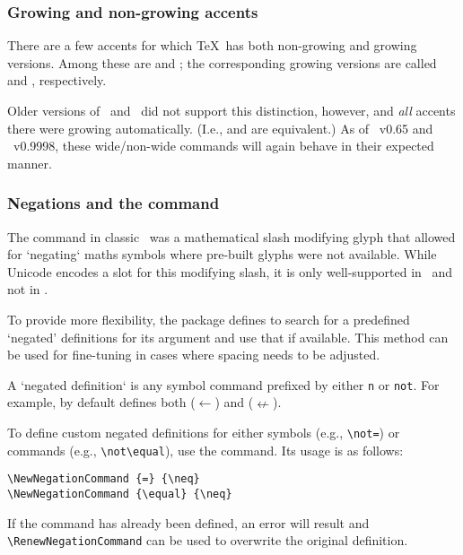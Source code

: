 \subsubsection{Growing and non-growing accents}

There are a few accents for which \TeX\ has both non-growing and growing
versions.  Among these are  and ; the corresponding growing
versions are called  and , respectively.

Older versions of \XeTeX\ and \LuaTeX\ did not support this distinction,
however, and \emph{all} accents there were growing automatically. (I.e.,
 and  are equivalent.) As of \LuaTeX\ v0.65 and \XeTeX\
v0.9998, these wide/non-wide commands will again behave in their expected
manner.


\subsubsection{Negations and the  command}

The  command in classic \LaTeXe\ was a mathematical slash modifying glyph that allowed for `negating` maths symbols where pre-built glyphs were not available. While Unicode encodes a slot for this modifying slash, it is only well-supported in \LuaTeX\ and not in \XeTeX.

To provide more flexibility, the  package defines  to search for a predefined `negated' definitions for its argument and use that if available. This method can be used for fine-tuning in cases where spacing needs to be adjusted.

A `negated definition` is any symbol command prefixed by either \verb|n| or \verb|not|. For example,  by default defines both  ($\leftarrow$) and  ($\nleftarrow$).

To define custom negated definitions for either symbols (e.g., \verb|\not=|) or commands (e.g., \verb|\not\equal|), use the  command. Its usage is as follows:
\begin{verbatim}
\NewNegationCommand {=} {\neq}
\NewNegationCommand {\equal} {\neq}
\end{verbatim}
If the command has already been defined, an error will result and \verb|\RenewNegationCommand| can be used to overwrite the original definition.


